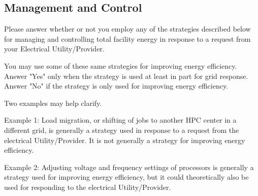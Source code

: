 \subsection{Management and Control}
Please answer whether or not you employ any of the strategies described below for managing 
and controlling total facility energy in response to a request from your Electrical Utility/Provider.

You may use some of these same strategies for improving energy efficiency. 
Answer "Yes" only when the strategy is used at least in part for grid response. Answer "No" if the strategy is only used for improving energy efficiency.

Two examples may help clarify.

Example 1: Load migration, or shifting of jobs to another HPC center in a different grid, is 
generally a strategy used in response to a request from the electrical Utility/Provider. It 
is not generally a strategy for improving energy efficiency.

Example 2: Adjusting voltage and frequency settings of processors is generally a strategy 
used for improving energy efficiency, but it could theoretically also be used for responding to 
the electrical Utility/Provider.

